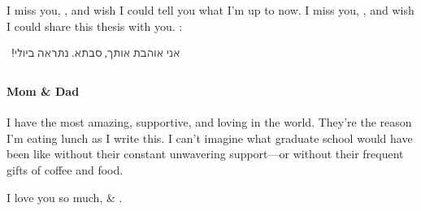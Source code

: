 I miss you, , and wish I could tell you what I'm up to now.
I miss you, , and wish I could share this thesis with you.
:

\begin{flushright}
\includegraphics[height=6mm]{savta.png}
\end{flushright}

\paragraph{Mom \& Dad}

I have the most amazing, supportive, and loving  in the world.
They're the reason I'm eating lunch as I write this.
I can't imagine what graduate school would have been like without their constant
unwavering support---or without their frequent gifts of coffee and food.

I love you so much,  \& .

